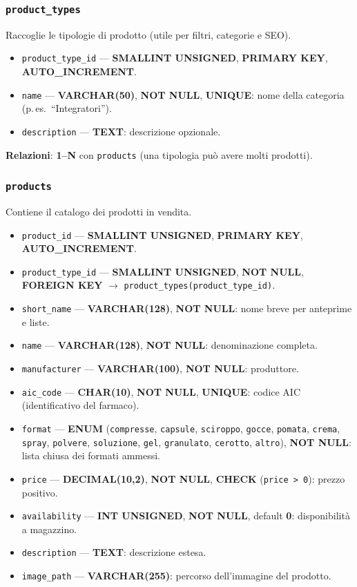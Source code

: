 \subsubsection{\texttt{product\_types}}
Raccoglie le tipologie di prodotto (utile per filtri, categorie e SEO).
\begin{itemize}[leftmargin=2.2em]
  \item \texttt{product\_type\_id} — \textbf{SMALLINT UNSIGNED}, \textbf{PRIMARY KEY}, \textbf{AUTO\_INCREMENT}.
  \item \texttt{name} — \textbf{VARCHAR(50)}, \textbf{NOT NULL}, \textbf{UNIQUE}: nome della categoria (p.\,es.\ ``Integratori'').
  \item \texttt{description} — \textbf{TEXT}: descrizione opzionale.
\end{itemize}
\textbf{Relazioni}: \textbf{1--N} con \texttt{products} (una tipologia può avere molti prodotti).

\subsubsection{\texttt{products}}
Contiene il catalogo dei prodotti in vendita.
\begin{itemize}[leftmargin=2.2em]
  \item \texttt{product\_id} — \textbf{SMALLINT UNSIGNED}, \textbf{PRIMARY KEY}, \textbf{AUTO\_INCREMENT}.
  \item \texttt{product\_type\_id} — \textbf{SMALLINT UNSIGNED}, \textbf{NOT NULL}, \textbf{FOREIGN KEY} $\rightarrow$ \texttt{product\_types(product\_type\_id)}.
  \item \texttt{short\_name} — \textbf{VARCHAR(128)}, \textbf{NOT NULL}: nome breve per anteprime e liste.
  \item \texttt{name} — \textbf{VARCHAR(128)}, \textbf{NOT NULL}: denominazione completa.
  \item \texttt{manufacturer} — \textbf{VARCHAR(100)}, \textbf{NOT NULL}: produttore.
  \item \texttt{aic\_code} — \textbf{CHAR(10)}, \textbf{NOT NULL}, \textbf{UNIQUE}: codice AIC (identificativo del farmaco).
  \item \texttt{format} — \textbf{ENUM} (\texttt{compresse}, \texttt{capsule}, \texttt{sciroppo}, \texttt{gocce}, \texttt{pomata}, \texttt{crema}, \texttt{spray}, \texttt{polvere}, \texttt{soluzione}, \texttt{gel}, \texttt{granulato}, \texttt{cerotto}, \texttt{altro}), \textbf{NOT NULL}: lista chiusa dei formati ammessi.
  \item \texttt{price} — \textbf{DECIMAL(10,2)}, \textbf{NOT NULL}, \textbf{CHECK} (\texttt{price > 0}): prezzo positivo.
  \item \texttt{availability} — \textbf{INT UNSIGNED}, \textbf{NOT NULL}, default \textbf{0}: disponibilità a magazzino.
  \item \texttt{description} — \textbf{TEXT}: descrizione estesa.
  \item \texttt{image\_path} — \textbf{VARCHAR(255)}: percorso dell’immagine del prodotto.
\end{itemize}

